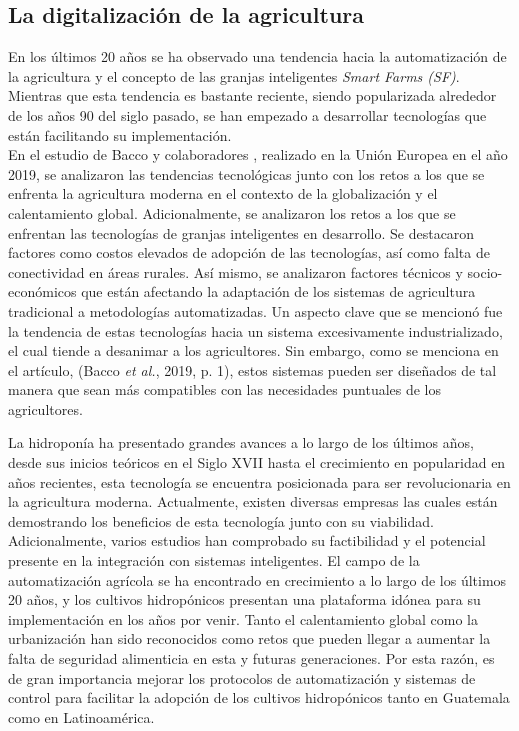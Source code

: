 \subsection*{La digitalización de la agricultura}
En los últimos 20 años se ha observado una tendencia hacia la automatización de la agricultura y el concepto de las granjas inteligentes \textit{Smart Farms (SF)}. Mientras que esta tendencia es bastante reciente, siendo popularizada alrededor de los años 90 del siglo pasado, se han empezado a desarrollar tecnologías que están facilitando su implementación. 
\\ En el estudio de Bacco y colaboradores \cite{bacco_digitisation_2019}, realizado en la Unión Europea en el año 2019, se analizaron las tendencias tecnológicas junto con los retos a los que se enfrenta la agricultura moderna en el contexto de la globalización y el calentamiento global. Adicionalmente, se analizaron los retos a los que se enfrentan las tecnologías de granjas inteligentes en desarrollo. Se destacaron factores como costos elevados de adopción de las tecnologías, así como falta de conectividad en áreas rurales. Así mismo, se analizaron factores técnicos y socio-económicos que están afectando la adaptación de los sistemas de agricultura tradicional a metodologías automatizadas. Un aspecto clave que se mencionó fue la tendencia de estas tecnologías hacia un sistema excesivamente industrializado, el cual tiende a desanimar a los agricultores. Sin embargo, como se menciona en el artículo,  (Bacco \textit{et al.}, 2019, p. 1), estos sistemas pueden ser diseñados de tal manera que sean más compatibles con las necesidades puntuales de los agricultores. %

\indent La hidroponía ha presentado grandes avances a lo largo de los últimos años, desde sus inicios teóricos en el Siglo XVII hasta el crecimiento en popularidad en años recientes, esta tecnología se encuentra posicionada para ser revolucionaria en la agricultura moderna. Actualmente, existen diversas empresas las cuales están demostrando los beneficios de esta tecnología junto con su viabilidad. Adicionalmente, varios estudios han comprobado su factibilidad y el potencial presente en la integración con sistemas inteligentes. El campo de la automatización agrícola se ha encontrado en crecimiento a lo largo de los últimos 20 años, y los cultivos hidropónicos presentan una plataforma idónea para su implementación en los años por venir. Tanto el calentamiento global como la urbanización han sido reconocidos como retos que pueden llegar a aumentar la falta de seguridad alimenticia en esta y futuras generaciones. Por esta razón, es de gran importancia mejorar los protocolos de automatización y sistemas de control para facilitar la adopción de los cultivos hidropónicos tanto en Guatemala como en Latinoamérica.
